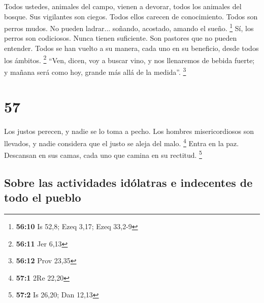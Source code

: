  Todos ustedes, animales del campo, vienen a devorar,
todos los animales del bosque.  Sus vigilantes son
ciegos. Todos ellos carecen de conocimiento. Todos son perros mudos. No
pueden ladrar... soñando, acostado, amando el sueño. \footnote{\textbf{56:10}
  Is 52,8; Ezeq 3,17; Ezeq 33,2-9}  Sí, los perros son
codiciosos. Nunca tienen suficiente. Son pastores que no pueden
entender. Todos se han vuelto a su manera, cada uno en su beneficio,
desde todos los ámbitos. \footnote{\textbf{56:11} Jer 6,13}
 ``Ven, dicen, voy a buscar vino, y nos llenaremos de
bebida fuerte; y mañana será como hoy, grande más allá de la medida''.
\footnote{\textbf{56:12} Prov 23,35}

\hypertarget{section-56}{%
\section{57}\label{section-56}}

 Los justos perecen, y nadie se lo toma a pecho. Los
hombres misericordiosos son llevados, y nadie considera que el justo se
aleja del malo. \footnote{\textbf{57:1} 2Re 22,20}  Entra
en la paz. Descansan en sus camas, cada uno que camina en su rectitud.
\footnote{\textbf{57:2} Is 26,20; Dan 12,13}

\hypertarget{sobre-las-actividades-iduxf3latras-e-indecentes-de-todo-el-pueblo}{%
\subsection{Sobre las actividades idólatras e indecentes de todo el
pueblo}\label{sobre-las-actividades-iduxf3latras-e-indecentes-de-todo-el-pueblo}}

